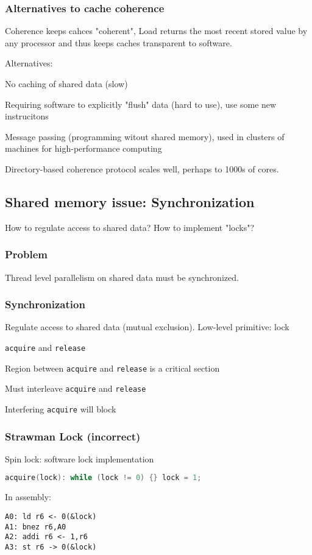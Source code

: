 \documentclass[a4paper, fontsize=8pt, landscape, DIV=1]{scrartcl}
\makeatletter
\renewenvironment{outline}[1][]{%
  \ifthenelse{\equal{#1}{}}{}{\renewcommand{\ol@type}{#1}}%
  \ol@z%
  \newcommand{\0}{\ol@toz\ol@z}%
  \newcommand{\1}{\vspace{\dimexpr\outlinespacingscalar\baselineskip-\baselineskip}\ol@toi\ol@i\item}%
  \newcommand{\2}{\vspace{\dimexpr\outlinespacingscalartwo\baselineskip-\baselineskip}\ol@toii\ol@ii\item}%
  \newcommand{\3}{\vspace{\dimexpr\outlinespacingscalar\baselineskip-\baselineskip}\ol@toiii\ol@iii\item}%
  \newcommand{\4}{\vspace{\dimexpr\outlinespacingscalar\baselineskip-\baselineskip}\ol@toiiii\ol@iiii\item}%
}{%
  \ol@toz\ol@exit%
}
\def\outlinespacingscalar{0.5}
\def\outlinespacingscalartwo{0.5}
\makeatother
\begin{document}
\begin{multicols*}{4}
  \subsubsection{Alternatives to cache coherence}
  Coherence keeps cahces "coherent", Load returns the most recent stored value by any processor
  and thus keeps caches transparent to software.

  Alternatives:
  \begin{outline}
    \1 No caching of shared data (slow)
    \1 Requiring software to explicitly "flush" data (hard to use), use some new instrucitons
    \1 Message passing (programming witout shared memory), used in clusters of machines for 
    high-performance computing
  \end{outline}

  Directory-based coherence protocol scales well, perhaps to 1000s of cores.

  \subsection{Shared memory issue: Synchronization}
  How to regulate access to shared data? How to implement "locks"?

  \subsubsection{Problem}
  Thread level parallelism on shared data must be synchronized.

  \subsubsection{Synchronization}
  Regulate access to shared data (mutual exclusion). Low-level primitive: lock
  \begin{outline}
    \1 \texttt{acquire} and \texttt{release}
    \1 Region between \texttt{acquire} and \texttt{release} is a critical section
    \1 Must interleave \texttt{acquire} and \texttt{release}
    \1 Interfering \texttt{acquire} will block
  \end{outline}

  \subsubsection{Strawman Lock (incorrect)}
  Spin lock: software lock implementation
  \begin{lstlisting}[language=C]
acquire(lock): while (lock != 0) {} lock = 1;\end{lstlisting}
  In assembly:
  \begin{lstlisting}[language={[x86masm]Assembler}]
A0: ld r6 <- 0(&lock)
A1: bnez r6,A0
A2: addi r6 <- 1,r6
A3: st r6 -> 0(&lock)\end{lstlisting}


\end{multicols*}
\end{document}
